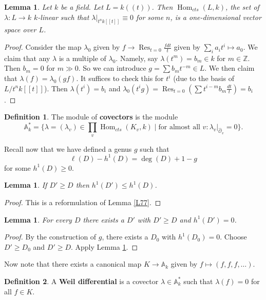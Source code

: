 \documentclass{article}
\newcommand{\Z}{\mathbb{Z}}
\DeclareMathOperator{\Hom}{Hom}
\DeclareMathOperator{\res}{Res}
\theoremstyle{plain}
\newtheorem{lem}[thm]{Lemma}
\theoremstyle{definition}
\newtheorem{defn}{Definition}
\theoremstyle{remark}
\begin{document}
\begin{lem}
\label{L85}
Let $k$ be a field. Let $L=k((t))$. Then $\Hom_{cts}(L,k)$, the set of $\lambda:L\to k$ $k$-linear such that $\lambda|_{t^nk[[t]]}\equiv 0$ for some $n$, is a one-dimensional vector space over $L$.
\end{lem}
\begin{proof}
Consider the map $\lambda_0$ given by $f\to\res_{t=0}\frac{fdt}{t}$ given by $\sum_i a_it^i\mapsto a_0$. We claim that any $\lambda$ is a multiple of $\lambda_0$. Namely, say $\lambda(t^m)= b_m\in k$ for $m\in\Z$. Then $b_m=0$ for $m\gg0$. So we can introduce $g=\sum b_mt^{-m}\in L$. We then claim that $\lambda(f)=\lambda_0(gf).$ It suffices to check this for $t^i$ (due to the basis of $L/t^nk[[t]]$). Then $\lambda(t^i)=b_i$ and $\lambda_0(t^i g)=\res_{t=0}\left(\sum t^{i-m}b_m\frac{dt}{t}\right)=b_i$.
\end{proof}

\begin{defn}
The module of \textbf{covectors} is the module
\[\mathbb{A}_k^*=\{\lambda=(\lambda_v)\in\prod_v\Hom_{cts}(K_v,k)\mid \text{for almost all }v: \lambda_v|_{\hat{\mathcal{O}}_v}=0\}.\]
\end{defn}

\noindent Recall now that we have defined a genus $g$ such that
\[\ell(D)-h^1(D)=\deg(D)+1-g\]
for some $h^1(D)\geq 0$.

\begin{lem}
\label{L86}
If $D'\geq D$ then $h^1(D')\leq h^1(D)$.
\end{lem}
\begin{proof}
This is a reformulation of Lemma \ref{L77}.
\end{proof}

\begin{lem}
\label{L87}
For every $D$ there exists a $D'$ with $D'\geq D$ and $h^1(D')=0$.
\end{lem}
\begin{proof}
By the construction of $g$, there exists a $D_0$ with $h^1(D_0)=0.$ Choose $D'\geq D_0$ and $D'\geq D$. Apply Lemma \ref{L86}.
\end{proof}

\noindent Now note that there exists a canonical map $K\to\mathbb{A}_k$ given by $f\mapsto(f,f,f,\ldots)$.

\begin{defn}
A \textbf{Weil differential} is a covector $\lambda\in\mathbb{A}_k^*$ such that $\lambda(f)=0$ for all $f\in K$.
\end{defn}
\end{document}
